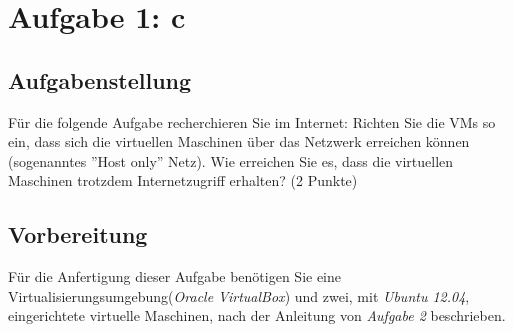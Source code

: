 \newpage
\section{Aufgabe 1: c}

\subsection{Aufgabenstellung}
Für die folgende Aufgabe recherchieren Sie im Internet: Richten Sie die VMs so ein, dass sich die virtuellen Maschinen über das Netzwerk erreichen können (sogenanntes ”Host only”
Netz). Wie erreichen Sie es, dass die virtuellen Maschinen trotzdem Internetzugriff erhalten?
(2 Punkte)

\subsection{Vorbereitung}
Für die Anfertigung dieser Aufgabe benötigen Sie eine Virtualisierungsumgebung(\textit{Oracle VirtualBox}) und zwei, mit \textit{Ubuntu 12.04}, eingerichtete virtuelle Maschinen, nach der Anleitung von \textit{Aufgabe 2} beschrieben.

